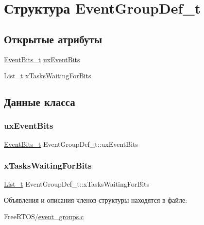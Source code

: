\hypertarget{struct_event_group_def__t}{}\section{Структура Event\+Group\+Def\+\_\+t}
\label{struct_event_group_def__t}
\subsection*{Открытые атрибуты}
\begin{DoxyCompactItemize}
\item 
\mbox{\hyperlink{event__groups_8h_ab2f21b93db0b2a0ab64d7a81ff32ac2e}{Event\+Bits\+\_\+t}} \mbox{\hyperlink{struct_event_group_def__t_ab1bcd95a3330b71c55198b2352926643}{ux\+Event\+Bits}}
\item 
\mbox{\hyperlink{list_8h_afd590ef6400071b4d63d65ef90bea7f4}{List\+\_\+t}} \mbox{\hyperlink{struct_event_group_def__t_a3dd347560456bfe452415efb52760dc3}{x\+Tasks\+Waiting\+For\+Bits}}
\end{DoxyCompactItemize}


\subsection{Данные класса}
\mbox{\label{struct_event_group_def__t_ab1bcd95a3330b71c55198b2352926643}} 
\subsubsection{\texorpdfstring{uxEventBits}{uxEventBits}}
{\footnotesize\ttfamily \mbox{\hyperlink{event__groups_8h_ab2f21b93db0b2a0ab64d7a81ff32ac2e}{Event\+Bits\+\_\+t}} Event\+Group\+Def\+\_\+t\+::ux\+Event\+Bits}

\mbox{\label{struct_event_group_def__t_a3dd347560456bfe452415efb52760dc3}} 
\subsubsection{\texorpdfstring{xTasksWaitingForBits}{xTasksWaitingForBits}}
{\footnotesize\ttfamily \mbox{\hyperlink{list_8h_afd590ef6400071b4d63d65ef90bea7f4}{List\+\_\+t}} Event\+Group\+Def\+\_\+t\+::x\+Tasks\+Waiting\+For\+Bits}



Объявления и описания членов структуры находятся в файле\+:\begin{DoxyCompactItemize}
\item 
Free\+R\+T\+O\+S/\mbox{\hyperlink{event__groups_8c}{event\+\_\+groups.\+c}}\end{DoxyCompactItemize}
